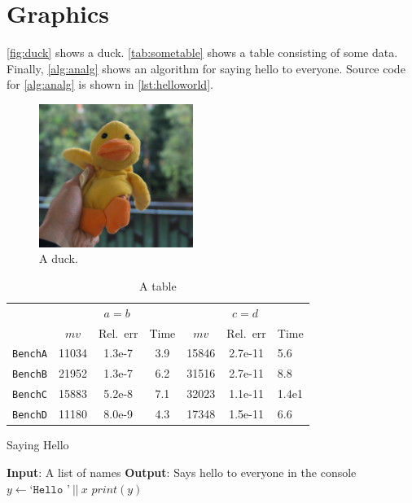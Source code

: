 \documentclass{yqart}
\begin{document}
\section{Graphics}
\autoref{fig:duck} shows a duck. \autoref{tab:sometable} shows a table consisting of some data. Finally, \autoref{alg:analg} shows an algorithm for saying hello to everyone. Source code for \autoref{alg:analg} is shown in \autoref{lst:helloworld}.

\begin{figure}[ht]
\centering
\includegraphics[width=5cm]{duck.jpg}
\caption{A duck.}\label{fig:duck}
\end{figure}

\begin{table}[ht]
    \centering
        \caption{A table}
    \label{tab:sometable}

    \begin{tabular}{lcccccl}\toprule
    & \multicolumn{3}{c}{$a=b$} & \multicolumn{3}{c}{$c=d$}
    \\\cmidrule(lr){2-4}\cmidrule(lr){5-7}
               & $mv$  & Rel.~err & Time    & $mv$  & Rel.~err & Time\\\midrule
    \texttt{BenchA}    & 11034 & 1.3e-7 & 3.9 & 15846 & 2.7e-11 & 5.6 \\
    \texttt{BenchB} & 21952 & 1.3e-7 & 6.2 & 31516 & 2.7e-11 & 8.8 \\
    \texttt{BenchC} & 15883 & 5.2e-8 & 7.1 & 32023 & 1.1e-11 & 1.4e1\\
    \texttt{BenchD}   & 11180 & 8.0e-9 & 4.3 & 17348 & 1.5e-11 & 6.6 \\\bottomrule
    \end{tabular}
\end{table}

\begin{algorithm}[ht]
\caption{Saying Hello}\label{alg:analg}
\begin{algorithmic}[1]
\Statex \textbf{Input}: A list of names
\Statex \textbf{Output}: Says hello to everyone in the console
        \State $y\gets \texttt{`Hello '} ~||~ x$ 
        \State $\textit{print}(y)$
    \EndFor
    \State {}
\EndFunction

\end{algorithmic}
\end{algorithm}
\end{document}
